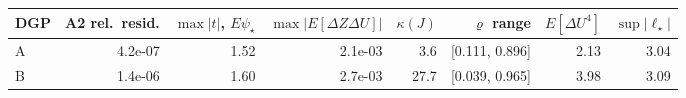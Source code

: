 \begin{tabular}{lrrrrrrr}
\toprule
DGP & A2 rel.\ resid. & $\max|t|$, $E\psi_\star$ & $\max|E[\Delta Z\Delta U]|$ & $\kappa(J)$ & $\varrho$ range & $E[\Delta U^4]$ & $\sup|\ell_\star|$ \\
\midrule
A & 4.2e-07 & 1.52 & 2.1e-03 & 3.6 & [0.111, 0.896] & 2.13 & 3.04 \\
B & 1.4e-06 & 1.60 & 2.7e-03 & 27.7 & [0.039, 0.965] & 3.98 & 3.09 \\
\bottomrule
\end{tabular}
